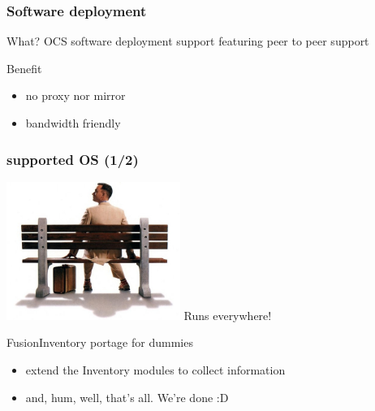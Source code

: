 \begin{frame}
    \frametitle{Software deployment}

    \begin{block}{What?}
    OCS software deployment support featuring peer to peer support
    \end{block}

    \begin{block}{Benefit}
    \begin{itemize}
        \item no proxy nor mirror
        \item bandwidth friendly
    \end{itemize}
    \end{block}
\end{frame}

\begin{frame}
    \frametitle{supported OS (1/2)}

    \includegraphics[height=4.5cm]{pics/forrest.jpg}
    Runs everywhere!

    \pause

    \begin{block}{FusionInventory portage for dummies}
        \begin{itemize}
            \item extend the Inventory modules to collect information
            \item and, hum, well, that's all. We're done :D
        \end{itemize}
    \end{block}
\end{frame}

